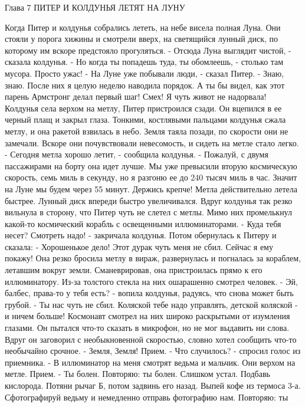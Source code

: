 Глава 7
        ПИТЕР И КОЛДУНЬЯ ЛЕТЯТ НА ЛУНУ

    Когда Питер и колдунья собрались лететь, на небе висела полная 
Луна. Они стояли у порога хижины и смотрели вверх, на светящийся 
лунный диск, по которому им вскоре предстояло прогуляться.
    - Отсюда Луна выглядит чистой, - сказала колдунья. - Но когда ты 
попадешь туда, ты обомлеешь, - столько там мусора. Просто ужас!
    - На Луне уже побывали люди, - сказал Питер.
    - Знаю, знаю. После них я целую неделю наводила порядок. А ты бы 
видел, как этот парень Армстронг делал первый шаг! Смех! Я чуть живот 
не надорвала!
    Колдунья села верхом на метлу, Питер пристроился сзади. Он 
вцепился в ее черный плащ и закрыл глаза. Тонкими, костлявыми пальцами 
колдунья сжала метлу, и она ракетой взвилась в небо. Земля таяла 
позади, по скорости они не замечали. Вскоре они почувствовали 
невесомость, и сидеть на метле стало легко.
    - Сегодня метла хорошо летит, - сообщила колдунья. - Пожалуй, с 
двумя пассажирами на борту она идет лучше. Мы уже превысили вторую 
космическую скорость, семь миль в секунду, но я разгоню ее до 240 
тысяч миль в час. Значит на Луне мы будем через 55 минут. Держись 
крепче!
    Метла действительно летела быстрее. Лунный диск впереди быстро 
увеличивался.
    Вдруг колдунья так резко вильнула в сторону, что Питер чуть не 
слетел с метлы. Мимо них промелькнул какой-то космический корабль с 
освещенными иллюминаторами.
    - Куда тебя несет? Смотреть надо! - закричала колдунья. Потом 
обернулась к Питеру и сказала:
    - Хорошенькое дело! Этот дурак чуть меня не сбил. Сейчас я ему 
покажу!
    Она резко бросила метлу в вираж, развернулась и погналась за 
кораблем, летавшим вокруг земли. Сманеврировав, она пристроилась прямо 
к его иллюминатору. Из-за толстого стекла на них ошарашенно смотрел 
человек.
    - Эй, балбес, права-то у тебя есть? - вопила колдунья, радуясь, 
что снова может быть грубой. - Ты нас чуть не сбил. Коляской тебе надо 
управлять, детской коляской - и ничем больше!
    Космонавт смотрел на них широко раскрытыми от изумления глазами. 
Он пытался что-то сказать в микрофон, но не мог выдавить ни слова. 
Вдруг он заговорил с необыкновенной скоростью, словно хотел сообщить 
что-то необычайно срочное.
    - Земля, Земля! Прием.
    - Что случилось? - спросил голос из приемника.
    - В иллюминатор на меня смотрят ведьма и мальчик. Они верхом на 
метле. Прием.
    - Ты болен. Повторяю: ты болен. Слишком устал. Подбавь кислорода. 
Потяни рычаг Б, потом задвинь его назад. Выпей кофе из термоса 3-а. 
Сфотографируй ведьму и немедленно отправь фотографию нам. Повторяю: ты 
